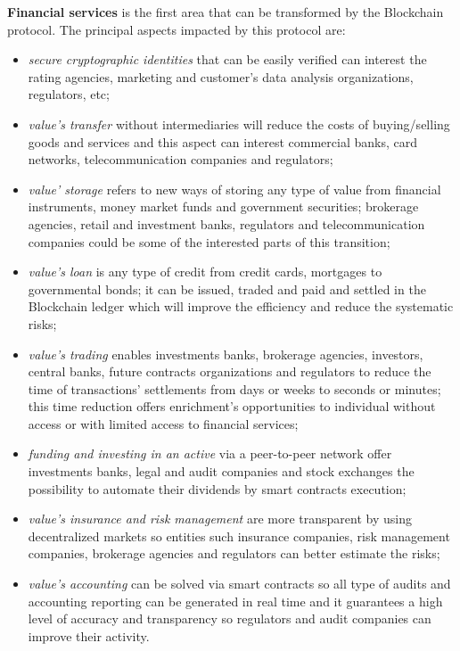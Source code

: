 \textbf{Financial services} is the first area that can be transformed by the Blockchain protocol. The principal aspects impacted by this protocol are:
\begin{itemize}
	\item \emph{secure cryptographic identities} that can be easily verified can interest the rating agencies, marketing and customer's data analysis organizations, regulators, etc;
	\item \emph{value's transfer} without intermediaries will reduce the costs of buying/selling goods and services and this aspect can interest commercial banks, card networks, telecommunication companies and regulators;
	\item \emph{value' storage} refers to new ways of storing any type of value from financial instruments, money market funds and government securities; brokerage agencies, retail and investment banks, regulators and telecommunication companies could be some of the interested parts of this transition;
	\item \emph{value's loan} is any type of credit from credit cards, mortgages to governmental bonds; it can be issued, traded and paid and settled in the Blockchain ledger which will improve the efficiency and reduce the systematic risks;
	\item \emph{value's trading} enables investments banks, brokerage agencies, investors, central banks, future contracts organizations and regulators to reduce the time of transactions' settlements from days or weeks to seconds or minutes; this time reduction offers enrichment's opportunities to individual without access or with limited access to financial services;
	\item \emph{funding and investing in an active} via a peer-to-peer network offer investments banks, legal and audit companies and stock exchanges the possibility to automate their dividends by smart contracts execution;
	\item \emph{value's insurance and risk management} are more transparent by using decentralized markets so entities such insurance companies, risk management companies, brokerage agencies and regulators can better estimate the risks;
	\item \emph{value's accounting} can be solved via smart contracts so all type of audits and accounting reporting can be generated in real time and it guarantees a high level of accuracy and transparency so regulators and audit companies can improve their activity.
\end{itemize}

